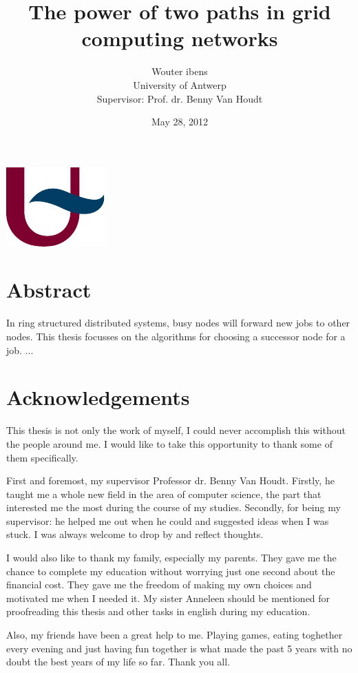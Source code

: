 \documentclass[10pt,a4paper]{article}
\author{Wouter ibens \\ University of Antwerp \\ Supervisor: Prof. dr. Benny Van Houdt}
\title{The power of two paths in grid computing networks}
\date{May 28, 2012}
\begin{document}
\vspace{8em}
\maketitle
\thispagestyle{empty}
\vspace{32em}
\begin{center}
\includegraphics[scale=1.0]{resources/ua.pdf}
\end{center}
\newpage

\section*{Abstract}
In ring structured distributed systems, busy nodes will forward new jobs to other nodes. This thesis focusses on the algorithms for choosing a successor node for a job. ...

\newpage

\section*{Acknowledgements}
This thesis is not only the work of myself, I could never accomplish this without the people around me. I would like to take this opportunity to thank some of them specifically.

First and foremost, my supervisor Professor dr. Benny Van Houdt. Firstly, he taught me a whole new field in the area of computer science, the part that interested me the most during the course of my studies. Secondly, for being my supervisor: he helped me out when he could and suggested ideas when I was stuck. I was always welcome to drop by and reflect thoughts.

I would also like to thank my family, especially my parents. They gave me the chance to complete my education without worrying just one second about the financial cost. They gave me the freedom of making my own choices and motivated me when I needed it. My sister Anneleen should be mentioned for proofreading this thesis and other tasks in english during my education.

Also, my friends have been a great help to me. Playing games, eating toghether every evening and just having fun together is what made the past 5 years with no doubt the best years of my life so far. Thank you all.
\end{document}
